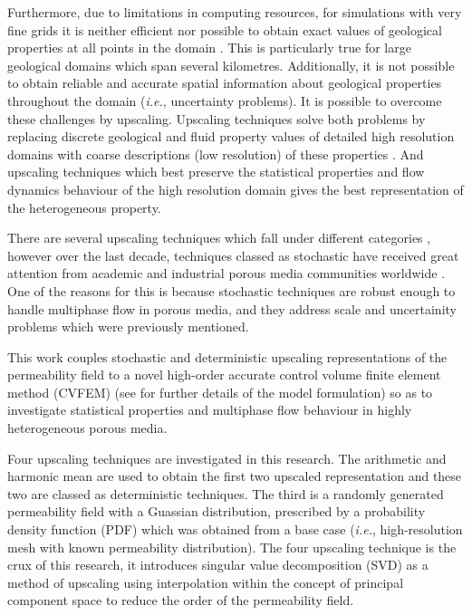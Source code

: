 \documentclass[preprint,authoryear,12pt]{elsarticle}
\newcommand{\ie}{{\it i.e., }}
\begin{document}
Furthermore, due to limitations in computing resources, for simulations with very fine grids it is neither efficient nor possible to obtain exact values of geological properties at all points in the domain \citep[\ie scale problems,][for further details]{Renard_1997} \cite{miller_1998} \citet{chen_2006}. This is particularly true for large geological domains which span several kilometres. Additionally, it is not possible to obtain reliable and accurate spatial information about geological properties throughout the domain ({\it i.e.}, uncertainty problems). It is possible to overcome these challenges by upscaling. Upscaling techniques solve both problems by replacing discrete geological and fluid property values of detailed high resolution domains with coarse descriptions (low resolution) of these properties \cite{Vereecken_2007}. And upscaling techniques which best preserve the statistical properties and flow dynamics behaviour of the high resolution domain gives the best representation of the heterogeneous property.

There are several upscaling techniques which fall under different categories \cite{Renard_1997, Szymkiewicz_2013, Hasting_2001}, however over the last decade, techniques classed as stochastic have received great attention from academic and industrial porous media communities worldwide \cite{Verwoerd_2009, Ravalec-Dupin_2010, Guilleminot_2012}. One of the reasons for this is because stochastic techniques are robust enough to handle multiphase flow in porous media, and they address scale and uncertainity problems which were previously mentioned.

This work couples stochastic and deterministic upscaling representations of the permeability field to a novel high-order accurate control volume finite element method (CVFEM) (see \cite{Gomes_2017} for further details of the model formulation) so as to investigate statistical properties and multiphase flow behaviour in highly heterogeneous porous media. 

Four upscaling techniques are investigated in this research. The arithmetic and harmonic mean are used to obtain the first two upscaled representation and these two are classed as deterministic techniques. The third is a randomly generated permeability field with a Guassian distribution, prescribed by a probability density function (PDF) which was obtained from a base case ({\it i.e.}, high-resolution mesh with known permeability distribution). The four upscaling technique is the crux of this research, it introduces singular value decomposition (SVD) as a method of upscaling using interpolation within the concept of principal component space to reduce the order of the permeability field.
\end{document}
